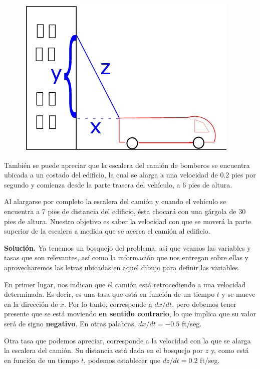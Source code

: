 \documentclass[12pt]{article}
\begin{document}
\begin{figure}[hbt!]
\centering
\includegraphics[scale=0.5]{img/related-prob-2.jpg}
\end{figure}

También se puede apreciar que la escalera del camión de bomberos se encuentra ubicada a un costado del edificio, la cual se alarga a una velocidad de 0.2 pies por segundo y comienza desde la parte trasera del vehículo, a 6 pies de altura.

\newpage

Al alargarse por completo la escalera del camión y cuando el vehículo se encuentra a 7 pies de distancia del edificio, ésta chocará con una gárgola de 30 pies de altura. Nuestro objetivo es saber la velocidad con que se moverá la parte superior de la escalera a medida que se acerca el camión al edificio.

\textbf{Solución.} \quad Ya tenemos un bosquejo del problema, así que veamos las variables y tasas que son relevantes, así como la información que nos entregan sobre ellas y aprovecharemos las letras ubicadas en aquel dibujo para definir las variables.

En primer lugar, nos indican que el camión está retrocediendo a una velocidad determinada. Es decir, es una tasa que está en función de un tiempo $t$ y se mueve en la dirección de $x$. Por lo tanto, corresponde a $dx/dt$, pero debemos tener presente que se está moviendo \textbf{en sentido contrario}, lo que implica que su valor será de signo \textbf{negativo}. En otras palabras, $dx/dt = -0.5$ ft/seg.

Otra tasa que podemos apreciar, corresponde a la velocidad con la que se alarga la escalera del camión. Su distancia está dada en el bosquejo por $z$ y, como está en función de un tiempo $t$, podemos establecer que $dz/dt = 0.2$ ft/seg.
\end{document}
